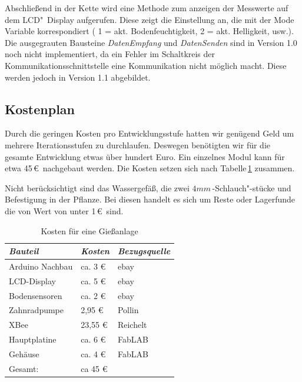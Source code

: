 Abschließend in der Kette wird eine Methode zum anzeigen der Messwerte auf dem LCD"~Display aufgerufen. Diese zeigt die Einstellung an, die mit der Mode Variable korrespondiert ( 1 = akt. Bodenfeuchtigkeit, 2 = akt.  Helligkeit, usw.). Die ausgegrauten Bausteine \emph{DatenEmpfang} und \emph{DatenSenden} sind in Version 1.0 noch nicht implementiert, da ein Fehler im Schaltkreis der Kommunikationsschnittstelle eine Kommunikation nicht möglich macht. Diese werden jedoch in Version 1.1 abgebildet.

	
\subsection{Kostenplan}
 Durch die geringen Kosten pro Entwicklungsstufe hatten wir genügend Geld um mehrere Iterationsstufen  zu durchlaufen.
 Deswegen benötigten wir für die gesamte Entwicklung etwas über hundert Euro.
 Ein einzelnes Modul kann für etwa 45\,\euro\ nachgebaut werden. 
 Die Kosten setzen sich nach Tabelle\,\ref{Kosten für eine Giessanlage} zusammen.
 
 Nicht berücksichtigt sind das Wassergefäß, die zwei \begin{math}4mm\end{math}\,-Schlauch"-stücke und Befestigung in der Pflanze.
 Bei diesen handelt es sich um Reste oder Lagerfunde die von Wert von unter 1\,\euro\ sind. 
 
\begin{table}[ht]
	\centering
	\onehalfspacing
	\footnotesize
	\caption{Kosten für eine Gießanlage}
	\label{Kosten für eine Giessanlage}
		\begin{tabular}{|l|ll|}
			\hline
\textit{Bauteil} & \textit{Kosten} & \textit{Bezugsquelle} \\
\hline
Arduino Nachbau & ca. 3 \euro & ebay \\
LCD-Display & ca. 5 \euro & ebay\\
Bodensensoren & ca. 2 \euro & ebay \\
Zahnradpumpe & 2,95 \euro & Pollin \\
XBee &  23,55 \euro & Reichelt \\
Hauptplatine & ca. 6 \euro & FabLAB \\
Gehäuse	& ca. 4 \euro & FabLAB \\

\hline
Gesamt: & ca 45 \euro & \\
\hline
\end{tabular}
\end{table}
